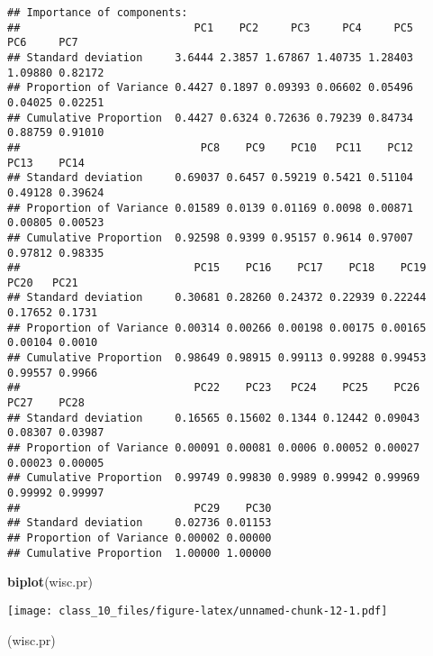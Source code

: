 \documentclass[
]{article}
\newenvironment{Shaded}{\begin{snugshade}}{\end{snugshade}}
\newcommand{\KeywordTok}[1]{\textcolor[rgb]{0.13,0.29,0.53}{\textbf{#1}}}
\newcommand{\NormalTok}[1]{#1}
\begin{document}
\begin{verbatim}
## Importance of components:
##                           PC1    PC2     PC3     PC4     PC5     PC6     PC7
## Standard deviation     3.6444 2.3857 1.67867 1.40735 1.28403 1.09880 0.82172
## Proportion of Variance 0.4427 0.1897 0.09393 0.06602 0.05496 0.04025 0.02251
## Cumulative Proportion  0.4427 0.6324 0.72636 0.79239 0.84734 0.88759 0.91010
##                            PC8    PC9    PC10   PC11    PC12    PC13    PC14
## Standard deviation     0.69037 0.6457 0.59219 0.5421 0.51104 0.49128 0.39624
## Proportion of Variance 0.01589 0.0139 0.01169 0.0098 0.00871 0.00805 0.00523
## Cumulative Proportion  0.92598 0.9399 0.95157 0.9614 0.97007 0.97812 0.98335
##                           PC15    PC16    PC17    PC18    PC19    PC20   PC21
## Standard deviation     0.30681 0.28260 0.24372 0.22939 0.22244 0.17652 0.1731
## Proportion of Variance 0.00314 0.00266 0.00198 0.00175 0.00165 0.00104 0.0010
## Cumulative Proportion  0.98649 0.98915 0.99113 0.99288 0.99453 0.99557 0.9966
##                           PC22    PC23   PC24    PC25    PC26    PC27    PC28
## Standard deviation     0.16565 0.15602 0.1344 0.12442 0.09043 0.08307 0.03987
## Proportion of Variance 0.00091 0.00081 0.0006 0.00052 0.00027 0.00023 0.00005
## Cumulative Proportion  0.99749 0.99830 0.9989 0.99942 0.99969 0.99992 0.99997
##                           PC29    PC30
## Standard deviation     0.02736 0.01153
## Proportion of Variance 0.00002 0.00000
## Cumulative Proportion  1.00000 1.00000
\end{verbatim}

\begin{Shaded}
\begin{Highlighting}[]
\KeywordTok{biplot}\NormalTok{(wisc.pr)}
\end{Highlighting}
\end{Shaded}

\texttt{[image: class\_10\_files/figure-latex/unnamed-chunk-12-1.pdf]}

\begin{Shaded}
\begin{Highlighting}[]
\NormalTok{(wisc.pr)}
\end{Highlighting}
\end{Shaded}
\end{document}
